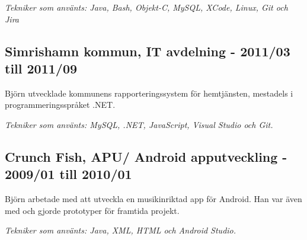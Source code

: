 \begin{minipage}[t]{0.9\textwidth}
    \vspace{5pt}\textit{Tekniker som använts: Java, Bash, Objekt-C, MySQL, XCode, Linux, Git och Jira} 
      
  
    \vspace{15pt} %
    \subsection*{\textcolor{colorTitelErfarenhet}{Simrishamn kommun, IT avdelning - 2011/03 till 2011/09}}
    Björn utvecklade kommunens rapporteringssystem för hemtjänsten, mestadels i programmeringsspråket .NET.
    
    \vspace{5pt}\textit{Tekniker som använts: MySQL, .NET, JavaScript, Visual Studio och Git.}
      
  
    \vspace{15pt} %
    \subsection*{\textcolor{colorTitelErfarenhet}{Crunch Fish, APU/ Android apputveckling - 2009/01 till 2010/01}}
    Björn arbetade med att utveckla en musikinriktad app för Android. Han var även med och gjorde prototyper för framtida projekt.
    
    \vspace{5pt}\textit{Tekniker som använts: Java, XML, HTML och Android Studio.}
\end{minipage}%
